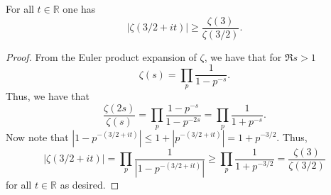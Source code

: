 \begin{theorem}[ZetaFixedLowerBound]
\label{ZetaFixedLowerBound}
\leanok
For all $t\in\mathbb{R}$ one has
    $$|\zeta(3/2+it)|\geq\frac{\zeta(3)}{\zeta(3/2)}.$$
\end{theorem}
\begin{proof}
\leanok
From the Euler product expansion of $\zeta$, we have that for $\Re s>1$
    $$\zeta(s)=\prod_p\frac{1}{1-p^{-s}}.$$
    Thus, we have that
    $$\frac{\zeta(2s)}{\zeta(s)}=\prod_p\frac{1-p^{-s}}{1-p^{-2s}}=\prod_p\frac{1}{1+p^{-s}}.$$
    Now note that $|1-p^{-(3/2+it)}|\leq 1+|p^{-(3/2+it)}|=1+p^{-3/2}$. Thus,
    $$|\zeta(3/2+it)|=\prod_p\frac{1}{|1-p^{-(3/2+it)}|}
      \geq\prod_p\frac{1}{1+p^{-3/2}}=\frac{\zeta(3)}{\zeta(3/2)}$$
    for all $t\in\mathbb{R}$ as desired.
\end{proof}

